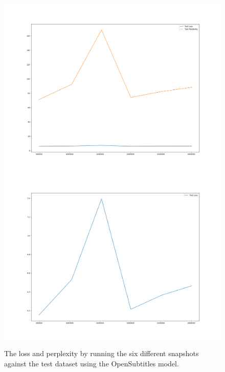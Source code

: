 \begin{figure}[H]
	\includegraphics[width=\linewidth]{img/plots/opensubtitles_not_reversed/test_metrics_both.png}
	\centering
	\small
	\endminipage\hfill
	\includegraphics[width=\linewidth]{img/plots/opensubtitles_not_reversed/test_metrics_loss.png}
	\centering
	\small
	\endminipage\hfill
	\caption{The loss and perplexity by running the six different snapshots against the test dataset using the OpenSubtitles model.}
	\label{result:test_performance:opensubtitles}
\end{figure}

